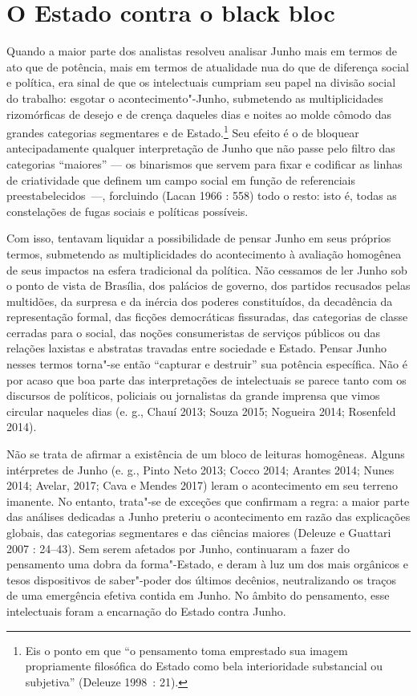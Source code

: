 \section{O Estado contra o black bloc}

Quando a maior parte dos analistas
resolveu analisar Junho mais em termos de ato que de potência, mais em
termos de atualidade nua do que de diferença social e política, era
sinal de que os intelectuais cumpriam seu papel na divisão social do
trabalho: esgotar o acontecimento"-Junho, submetendo as multiplicidades
rizomórficas de desejo e de crença daqueles dias e noites ao molde
cômodo das grandes categorias segmentares e de Estado.\footnote{Eis o
  ponto em que ``o pensamento toma emprestado sua imagem
  propriamente filosófica do Estado como bela interioridade substancial
  ou subjetiva'' (Deleuze 1998~: 21).} Seu efeito é o de bloquear
antecipadamente qualquer interpretação de Junho que não passe pelo
filtro das categorias ``maiores'' --- os binarismos que servem para fixar
e codificar as linhas de criatividade que definem um campo social em
função de referenciais preestabelecidos~---, forcluindo (Lacan 1966 :
558) todo o resto: isto é, todas as constelações de fugas sociais e
políticas possíveis.

Com isso, tentavam liquidar a possibilidade de pensar Junho em seus
próprios termos, submetendo as multiplicidades do acontecimento à
avaliação homogênea de seus impactos na esfera tradicional da política.
Não cessamos de ler Junho sob o ponto de vista de Brasília, dos palácios
de governo, dos partidos recusados pelas multidões, da surpresa e da
inércia dos poderes constituídos, da decadência da representação formal,
das ficções democráticas fissuradas, das categorias de classe cerradas
para o social, das noções consumeristas de serviços públicos ou das
relações laxistas e abstratas travadas entre sociedade e Estado. Pensar
Junho nesses termos torna"-se então ``capturar e destruir'' sua potência
específica. Não é por acaso que boa parte das interpretações de
intelectuais se parece tanto com os discursos de políticos, policiais ou
jornalistas da grande imprensa que vimos circular naqueles dias (e. g.,
Chauí 2013; Souza 2015; Nogueira 2014; Rosenfeld 2014).

Não se trata de afirmar a existência de um bloco de leituras homogêneas.
Alguns intérpretes de Junho (e. g., Pinto Neto 2013; Cocco 2014; Arantes 2014;
Nunes 2014; Avelar, 2017; Cava e Mendes 2017) leram o
acontecimento em seu terreno imanente. No entanto, trata"-se de exceções
que confirmam a regra: a maior parte das análises dedicadas a Junho
preteriu o acontecimento em razão das explicações globais, das
categorias segmentares e das ciências maiores (Deleuze e Guattari 2007 :
24--43). Sem serem afetados por Junho, continuaram a fazer do pensamento
uma dobra da forma"-Estado, e deram à luz um dos mais orgânicos e tesos
dispositivos de saber"-poder dos últimos decênios, neutralizando os
traços de uma emergência efetiva contida em Junho. No âmbito do
pensamento, esse intelectuais foram a encarnação do Estado contra Junho.

